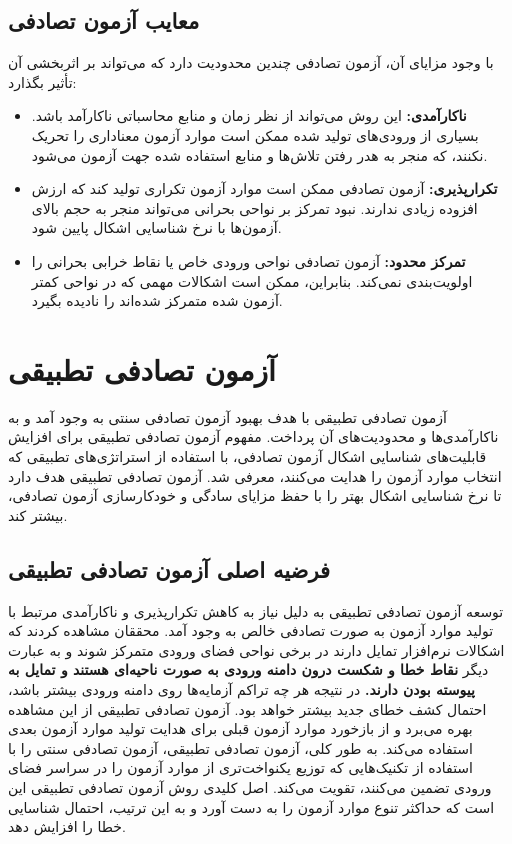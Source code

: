 \subsection{معایب آزمون تصادفی}
با وجود مزایای آن، آزمون تصادفی چندین محدودیت دارد که می‌تواند بر اثربخشی آن تأثیر بگذارد:
\begin{itemize}
	\item \textbf{ناکارآمدی:} این روش می‌تواند از نظر زمان و منابع محاسباتی ناکارآمد باشد. بسیاری از ورودی‌های تولید شده ممکن است موارد آزمون معناداری را تحریک نکنند، که منجر به هدر رفتن تلاش‌ها و منابع استفاده شده جهت آزمون می‌شود.
	\item \textbf{تکرارپذیری:} آزمون تصادفی ممکن است موارد آزمون تکراری تولید کند که ارزش افزوده زیادی ندارند. نبود تمرکز بر نواحی بحرانی می‌تواند منجر به حجم بالای آزمون‌ها با نرخ شناسایی اشکال پایین شود.
	\item \textbf{تمرکز محدود:} آزمون تصادفی نواحی ورودی خاص یا نقاط خرابی بحرانی را اولویت‌بندی نمی‌کند. بنابراین، ممکن است اشکالات مهمی که در نواحی کمتر آزمون شده متمرکز شده‌اند را نادیده بگیرد.
\end{itemize}


\section{آزمون تصادفی تطبیقی}
آزمون تصادفی تطبیقی   با هدف بهبود آزمون تصادفی سنتی به وجود آمد و به ناکارآمدی‌ها و محدودیت‌های آن پرداخت. مفهوم آزمون تصادفی تطبیقی برای افزایش قابلیت‌های شناسایی اشکال آزمون تصادفی، با استفاده از استراتژی‌های تطبیقی که انتخاب موارد آزمون را هدایت می‌کنند، معرفی شد. آزمون تصادفی تطبیقی هدف دارد تا نرخ شناسایی اشکال بهتر را با حفظ مزایای سادگی و خودکارسازی آزمون تصادفی، بیشتر کند.

\subsection{فرضیه اصلی آزمون تصادفی تطبیقی}

توسعه آزمون تصادفی تطبیقی به دلیل نیاز به کاهش تکرارپذیری و ناکارآمدی مرتبط با تولید موارد آزمون به صورت تصادفی خالص به وجود آمد. محققان مشاهده کردند که اشکالات نرم‌افزار تمایل دارند در برخی نواحی فضای ورودی متمرکز شوند و به عبارت دیگر \textbf{نقاط خطا و شکست درون دامنه ورودی به صورت ناحیه‌ای هستند و تمایل به پیوسته بودن دارند.} در نتیجه هر چه تراکم آزمایه‌ها روی دامنه ورودی بیشتر باشد، احتمال کشف خطای جدید بیشتر خواهد بود. آزمون تصادفی تطبیقی از این مشاهده بهره می‌برد و از بازخورد موارد آزمون قبلی برای هدایت تولید موارد آزمون بعدی استفاده می‌کند. به طور کلی، آزمون تصادفی تطبیقی، آزمون تصادفی سنتی را با استفاده از تکنیک‌هایی که توزیع یکنواخت‌تری از موارد آزمون را در سراسر فضای ورودی تضمین می‌کنند، تقویت می‌کند. اصل کلیدی روش آزمون تصادفی تطبیقی این است که حداکثر تنوع موارد آزمون را به دست آورد و به این ترتیب، احتمال شناسایی خطا را افزایش دهد.

